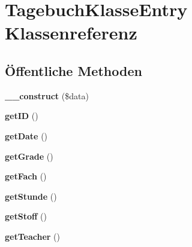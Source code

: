 \hypertarget{class_tagebuch_klasse_entry}{}\section{Tagebuch\+Klasse\+Entry Klassenreferenz}
\label{class_tagebuch_klasse_entry}
\subsection*{Öffentliche Methoden}
\begin{DoxyCompactItemize}
\item 
\mbox{\label{class_tagebuch_klasse_entry_aabcf2b805b3257a450ce2556c4937a37}} 
{\bfseries \+\_\+\+\_\+construct} (\$data)
\item 
\mbox{\label{class_tagebuch_klasse_entry_acd69970464be9d1a8ec61f5aebb81ae0}} 
{\bfseries get\+ID} ()
\item 
\mbox{\label{class_tagebuch_klasse_entry_a8110303471f265d5d77d110231deb5d0}} 
{\bfseries get\+Date} ()
\item 
\mbox{\label{class_tagebuch_klasse_entry_a98cfa90cda2322165af8b9deb1bc0534}} 
{\bfseries get\+Grade} ()
\item 
\mbox{\label{class_tagebuch_klasse_entry_ab320fe3d1f5ada1463be803f0efb52f5}} 
{\bfseries get\+Fach} ()
\item 
\mbox{\label{class_tagebuch_klasse_entry_a38e776791bec717ddf3253ea00a6e07d}} 
{\bfseries get\+Stunde} ()
\item 
\mbox{\label{class_tagebuch_klasse_entry_aa56680a5b4f515073c58951c7d971d72}} 
{\bfseries get\+Stoff} ()
\item 
\mbox{\label{class_tagebuch_klasse_entry_aef7322a250b565468d3e269e8bb155f3}} 
{\bfseries get\+Teacher} ()
\item 
\mbox{\label{class_tagebuch_klasse_entry_a964a22e2f2318d0f29a309f63e6713e2}} 

\end{DoxyCompactItemize}
